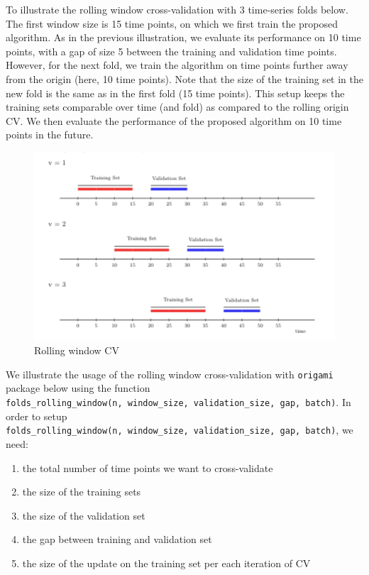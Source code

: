 \documentclass[12pt, krantz2,]{book}
\providecommand{\tightlist}{%
  \setlength{\itemsep}{0pt}\setlength{\parskip}{0pt}}
\theoremstyle{definition}
\theoremstyle{definition}
\theoremstyle{definition}
\newcommand{\1}{\mathbbm{1}}
\begin{document}
To illustrate the rolling window cross-validation with 3 time-series folds
below. The first window size is 15 time points, on which we first train the
proposed algorithm. As in the previous illustration, we evaluate its performance
on 10 time points, with a gap of size 5 between the training and validation time
points. However, for the next fold, we train the algorithm on time points
further away from the origin (here, 10 time points). Note that the size of the
training set in the new fold is the same as in the first fold (15 time points).
This setup keeps the training sets comparable over time (and fold) as compared
to the rolling origin CV. We then evaluate the performance of the proposed
algorithm on 10 time points in the future.

\begin{figure}

{\centering \includegraphics[width=0.8\linewidth]{img/image/rolling_window} 

}

\caption{Rolling window CV}\label{fig:unnamed-chunk-2}
\end{figure}

We illustrate the usage of the rolling window cross-validation with \texttt{origami}
package below using the function \texttt{folds\_rolling\_window(n,\ window\_size,\ validation\_size,\ gap,\ batch)}. In order to setup \texttt{folds\_rolling\_window(n,\ window\_size,\ validation\_size,\ gap,\ batch)}, we need:

\begin{enumerate}
\def\labelenumi{\arabic{enumi}.}
\tightlist
\item
  the total number of time points we want to cross-validate
\item
  the size of the training sets
\item
  the size of the validation set
\item
  the gap between training and validation set
\item
  the size of the update on the training set per each iteration of CV
\end{enumerate}
\end{document}
